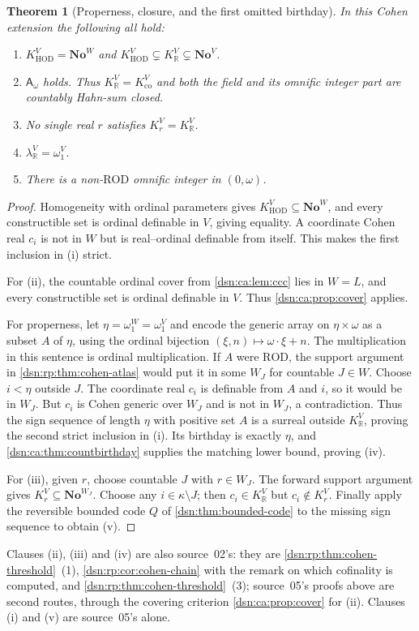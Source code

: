 \documentclass[11pt,a4paper]{article}
\numberwithin{equation}{section}
\newtheorem{theorem}{Theorem}[section]
\theoremstyle{definition}
\theoremstyle{remark}
\newcommand{\No}{\mathbf{No}}
\newcommand{\HOD}{\mathrm{HOD}}
\newcommand{\R}{\mathbb R}
\newcommand{\KH}{K_{\HOD}}
\newcommand{\ROD}{\mathrm{ROD}}
\newcommand{\KR}{K_{\R}}
\newcommand{\Kco}{K_{\mathrm{co}}}
\newcommand{\Asm}{\mathsf A_{\omega}}
\begin{document}
\begin{theorem}[Properness, closure, and the first omitted birthday]\label{dsn:ca:thm:cohenconsequences}
In this Cohen extension the following all hold:
\begin{enumerate}[label=\textup{(\roman*)}]
\item $\KH^V=\No^W$ and
$\KH^V\subsetneq\KR^V\subsetneq\No^V$.
\item $\Asm$ holds. Thus $\KR^V=\Kco^V$ and both the field and its
omnific integer part are countably Hahn-sum closed.
\item No single real $r$ satisfies $K_r^V=\KR^V$.
\item $\lambda_{\R}^V=\omega_1^V$.
\item There is a non-$\ROD$ omnific integer in $(0,\omega)$.
\end{enumerate}
\end{theorem}
\begin{proof}
Homogeneity with ordinal parameters gives
$\KH^V\subseteq\No^W$, and every constructible set is ordinal
definable in $V$, giving equality. A coordinate Cohen real $c_i$ is
not in $W$ but is real--ordinal definable from itself. This makes the
first inclusion in (i) strict.

For (ii), the countable ordinal cover from \cref{dsn:ca:lem:ccc} lies in
$W=L$, and every constructible set is ordinal definable in $V$.
Thus \cref{dsn:ca:prop:cover} applies.

For properness, let $\eta=\omega_1^W=\omega_1^V$ and encode the generic
array on $\eta\times\omega$ as a subset $A$ of $\eta$, using the
ordinal bijection $(\xi,n)\mapsto\omega\cdot\xi+n$. The multiplication
in this sentence is ordinal multiplication. If $A$ were $\ROD$, the
support argument in \cref{dsn:rp:thm:cohen-atlas} would put it in some $W_J$ for
countable $J\in W$. Choose $i<\eta$ outside $J$. The coordinate real
$c_i$ is definable from $A$ and $i$, so it would be in $W_J$. But $c_i$
is Cohen generic over $W_J$ and is not in $W_J$, a contradiction.
Thus the sign sequence of length $\eta$ with positive set $A$ is a
surreal outside $\KR^V$, proving the second strict inclusion in (i).
Its birthday is exactly $\eta$, and \cref{dsn:ca:thm:countbirthday} supplies
the matching lower bound, proving (iv).

For (iii), given $r$, choose countable $J$ with $r\in W_J$.
The forward support argument gives $K_r^V\subseteq\No^{W_J}$.
Choose any $i\in\kappa\setminus J$; then $c_i\in\KR^V$ but
$c_i\notin K_r^V$. Finally apply the reversible bounded code $Q$ of
\cref{dsn:thm:bounded-code} to the missing sign sequence to obtain (v).
\end{proof}
Clauses (ii), (iii) and (iv) are also source~02's: they are
\cref{dsn:rp:thm:cohen-threshold}~(1), \cref{dsn:rp:cor:cohen-chain} with the
remark on which cofinality is computed, and
\cref{dsn:rp:thm:cohen-threshold}~(3); source~05's proofs above are second
routes, through the covering criterion \cref{dsn:ca:prop:cover} for (ii).
Clauses (i) and (v) are source~05's alone.
\end{document}
